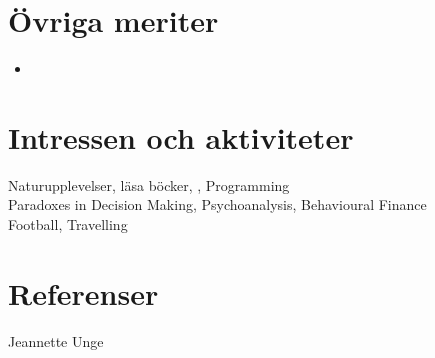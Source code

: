 \documentclass[11pt,a4paper]{article}
\begin{document}
\section{Övriga meriter}
\begin{itemize}
	\item  
\end{itemize}

\section{Intressen och aktiviteter}
Naturupplevelser, läsa böcker, , Programming\\
Paradoxes in Decision Making, Psychoanalysis, Behavioural Finance\\
Football, Travelling

\section{Referenser}
Jeannette Unge
\end{document}
